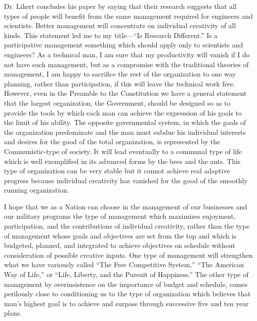 \documentclass{memoir}
\begin{document}
Dr. Likert concludes his paper by saying that their research suggests that all types of people will benefit from the same management required for engineers and scientists. Better management will concentrate on individual creativity of all kinds. This statement led me to my title---``Is Research Different.'' Is a participative management something which should apply only to scientists and engineers? As a technical man, I am sure that my productivity will vanish if I do not have such management, but as a compromise with the traditional theories of management, I am happy to sacrifice the rest of the organization to one way planning, rather than participation, if this will leave the technical work free. However, even in the Preamble to the Constitution we have a general statement that the largest organization, the Government, should be designed so as to provide the tools by which each man can achieve the expression of his goals to the limit of his ability. The opposite governmental system, in which the goals of the organization predominate and the man must subdue his individual interests and desires for the good of the total organization, is represented by the Communistic-type of society. It will lead eventually to a communal type of life which is well exemplified in its advanced forms by the bees and the ants. This type of organization can be very stable but it cannot achieve real adaptive progress because individual creativity has vanished for the good of the smoothly running organization.

I hope that we as a Nation can choose in the management of our businesses and our military programs the type of management which maximizes enjoyment, participation, and the contributions of individual creativity, rather than the type of management whose goals and objectives are set from the top and which is budgeted, planned, and integrated to achieve objectives on schedule without consideration of possible creative inputs. One type of management will strengthen what we have variously called ``The Free Competitive System,'' ``The American Way of Life,'' or ``Life, Liberty, and the Pursuit of Happiness.'' The other type of management by overinsistence on the importance of budget and schedule, comes perilously close to conditioning us to the type of organization which believes that man's highest goal is to achieve and surpass through successive five and ten year plans.

\printbibliography
\end{document}
